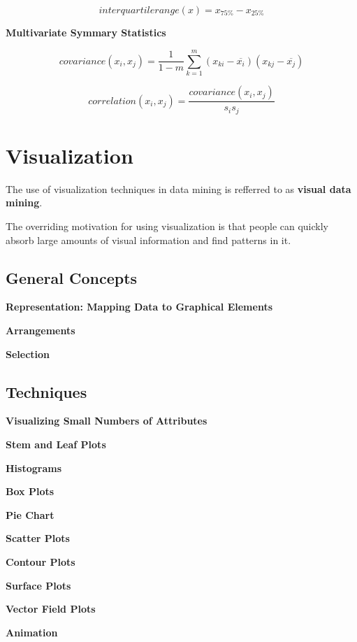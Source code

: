 		\begin{equation}
			interquartile range(x) = x_{75\%} - x_{25\%}
		\end{equation}

	{\bf Multivariate Symmary Statistics}

		\begin{equation}
			covariance(x_{i}, x_{j}) = \frac{1}{1 - m} \sum_{k=1}^{m} (x_{ki} - \overline{x_{i}})(x_{kj} -
			 \overline{x_{j}}) 
		\end{equation}

		\begin{equation}
			correlation(x_{i}, x_{j}) = \frac{covariance(x_{i}, x_{j})}{s_{i}s_{j}}
		\end{equation}

	\clearpage
	\section{Visualization}

	The use of visualization techniques in data mining is refferred to as 
	{\bf visual data mining}.

	The overriding motivation for using visualization is that people can quickly absorb
	large amounts of visual information and find patterns in it. 

	\subsection{General Concepts}
		{\bf Representation: Mapping Data to Graphical Elements}

		{\bf Arrangements}

		{\bf Selection}

	\subsection{Techniques}

		{\bf Visualizing Small Numbers of Attributes}

		{\bf Stem and Leaf Plots}

		{\bf Histograms}

		{\bf Box Plots}

		{\bf Pie Chart}

		{\bf Scatter Plots}

		{\bf Contour Plots}

		{\bf Surface Plots}

		{\bf Vector Field Plots}

		{\bf Animation}

